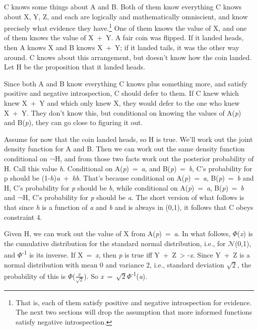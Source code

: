 \documentclass[
  12pt,
  letterpaper,
  DIV=11,
  numbers=noendperiod]{scrartcl}
\begin{document}
C knows some things about A and B. Both of them know everything C knows
about X, Y, Z, and each are logically and mathematically omniscient, and
know precisely what evidence they have.\footnote{That is, each of them
  satisfy positive and negative introspection for evidence. The next two
  sections will drop the assumption that more informed functions satisfy
  negative introspection.} One of them knows the value of X, and one of
them knows the value of X~+~Y. A fair coin was flipped. If it landed
heads, then A knows X and B knows X~+~Y; if it landed tails, it was the
other way around. C knows about this arrangement, but doesn't know how
the coin landed. Let H be the proposition that it landed heads.

Since both A and B know everything C knows plus something more, and
satisfy positive and negative introspection, C should defer to them. If
C knew which knew X~+~Y and which only knew X, they would defer to the
one who knew X~+~Y. They don't know this, but conditional on knowing the
values of A(\emph{p}) and B(\emph{p}), they can go close to figuring it
out.

Assume for now that the coin landed heads, so H is true. We'll work out
the joint density function for A and B. Then we can work out the same
density function conditional on ¬H, and from those two facts work out
the posterior probability of H. Call this value \emph{h}. Conditional on
A(\emph{p})~=~\emph{a}, and B(\emph{p})~=~\emph{b}, C's probability for
p should be (1-\emph{h})\emph{a}~+~\emph{hb}. That's because conditional
on A(\emph{p})~=~\emph{a}, B(\emph{p})~=~\emph{b} and H, C's probability
for \emph{p} should be \emph{b}, while conditional on
A(\emph{p})~=~\emph{a}, B(\emph{p})~=~\emph{b} and ¬H, C's probability
for \emph{p} should be \emph{a}. The short version of what follows is
that since \emph{h} is a function of \emph{a} and \emph{b} and is always
in (0,1), it follows that C obeys constraint 4.

Given H, we can work out the value of X from A(\emph{p})~=~\emph{a}. In
what follows, \(\Phi\)(\emph{x}) is the cumulative distribution for the
standard normal distribution, i.e., for \(\mathcal{N}\)(0,1), and
\(\Phi\)\textsuperscript{-1} is its inverse. If X~=~\emph{x}, then
\emph{p} is true iff Y~+~Z~\textgreater{} -\emph{x}. Since Y~+~Z is a
normal distribution with mean 0 and variance 2, i.e., standard deviation
\(\sqrt{2}\), the probability of this is
\(\Phi\)(\(\frac{x}{\sqrt{2}}\)). So
\emph{x}~=~\(\sqrt{2}\Phi\)\textsuperscript{-1}(\emph{a}).
\end{document}
